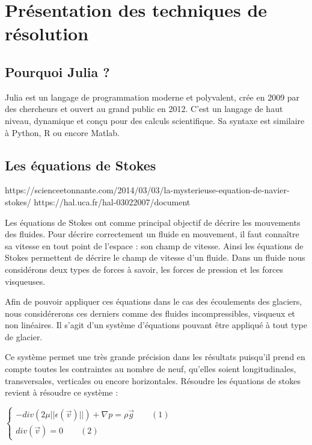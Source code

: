 \documentclass{article}
\begin{document}
\section{Présentation des techniques de résolution}

\subsection{Pourquoi Julia ?}

Julia est un langage de programmation moderne et polyvalent, crée en 2009 par des chercheurs et ouvert au grand public en 2012. C'est un langage de haut niveau, dynamique et conçu pour des calculs scientifique. Sa syntaxe est similaire à Python, R ou encore Matlab.
 


\subsection{Les équations de Stokes}

https://scienceetonnante.com/2014/03/03/la-mysterieuse-equation-de-navier-stokes/
https://hal.uca.fr/hal-03022007/document

Les équations de Stokes ont comme principal objectif de décrire les mouvements des fluides. 
Pour décrire correctement un fluide en mouvement, il faut connaître sa vitesse en tout point de l'espace : son champ de vitesse. Ainsi les équations de Stokes permettent de décrire le champ de vitesse d'un fluide. 
Dans un fluide nous considérons deux types de forces à savoir, les forces de pression et les forces visqueuses. 

Afin de pouvoir appliquer ces équations dans le cas des écoulements des glaciers, nous considérerons ces derniers comme des fluides incompressibles, visqueux et non linéaires. Il s'agit d'un système d'équations pouvant être appliqué à tout type de glacier.

Ce système permet une très grande précision dans les résultats puisqu'il prend en compte toutes les contraintes au nombre de neuf, qu’elles soient longitudinales, transversales, verticales ou encore horizontales. 
Résoudre les équations de stokes revient à résoudre ce système : 


\begin{center}
$\left\{
\begin{array}{l}
-div(2 \mu ||\epsilon(\vec{v})||) + \nabla p = \rho \vec{g} \qquad(1)  \\
div(\vec{v}) = 0 \qquad(2) 
\end{array}
\right.$
\end{center}
\end{document}
